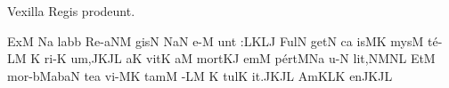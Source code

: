 \def\intralink#1{%
  \setbox\linkbox=\hbox{$\smile$}%
  \setbox\wordbox=\hbox{#1}%
  \setbox\linkbox=\hbox to\wd\wordbox{%
    \hss
    \lower\ht\linkbox\hbox{%
      \lower1pt\hbox{%
	\relax
	  \hbox{$\smile$}%
	}}%
    \hss}%
  \dp\linkbox=0pt
  \box\wordbox \llap{\box\linkbox}}


\beginhymn Vexilla Regis prodeunt.

\Internote
\nosolesmescustos
\initiumgregorianum
{}%
\sgn {}Ex\punctum M\egn
{}\pes Na\egn
\sgn la{}\bmolle b\punctum b\egn
\spatium
\sgn R{e}-\climacus aNM\egn
\sgn gis\punctum N\egn
\spatium
{}\torculus NaN\egn
\sgn {}e-\punctum M\egn
\sgn {}u{nt :}\clivis LK\augmentumduplex LJ\egn
\spatium
\divisiominor
\spatium
\sgn F{u}l\punctum N\egn
\sgn get\punctum N\egn
\spatium
{}c\punctum a\egn
\sgn {}is\clivis MK\egn
\spatium
\sgn mys\punctum M\egn
\sgn t{\'e}-\pes LM\egn
\spatium
\custos K
\lineaproxima
\sgn ri-\punctum K\egn
\sgn {}u{m,}\pes JK\augmentumduplex JL\egn
\spatium
\divisiomaior
\spatium
{}a{}\punctum K\egn
\spatium
\sgn v{i}t\punctum K\egn
\sgn {}a{}\punctum M\egn
\spatium
\sgn mo{rt}\clivis KJ\egn
\sgn {}em\punctum M\egn
\spatium
\sgn p{\'e}{rt}\Salicus MNa\egn
\sgn {}u-\punctum N\egn
\sgn li{t,}\clivis NM\augmentumduplex NL\egn
\spatium
\divisiominor
\spatium
\sgn {}Et\punctum M\egn
\spatium
\sgn m{o}{r-}\bmolle b\scandicussubbipunctis MabaN\egn
\sgn te{}\punctum a\egn
\spatium
\sgn v{i}-\clivis MK\egn
\sgn tam\punctum M\egn
\spatium
{}-\pes LM\egn
\spatium
\custos K
\lineaproxima
\sgn tul\punctum K\egn
\sgn {}i{t.}\pes JK\augmentumduplex JL\egn
\spatium
\divisiofinalis
\spatium
\sgn {}Am\torculus KLK\egn
\sgn {}en\pes JK\augmentumduplex JL\egn
\Finisgregoriana

\bigskip

\beginlyrics

